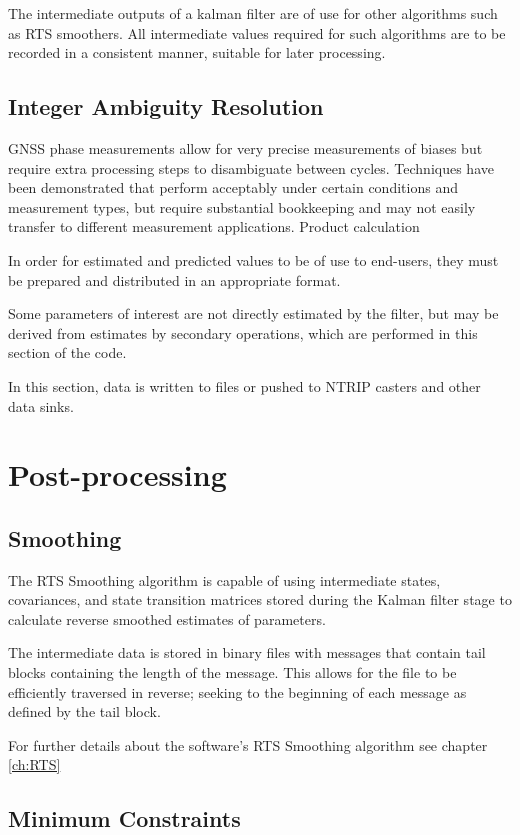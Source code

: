 The intermediate outputs of a kalman filter are of use for other algorithms such as RTS smoothers. All intermediate values required for such algorithms are to be recorded in a consistent manner, suitable for later processing.


\subsection{Integer Ambiguity Resolution}

GNSS phase measurements allow for very precise measurements of biases but require extra processing steps to disambiguate between cycles. Techniques have been demonstrated that perform acceptably under certain conditions and measurement types, but require substantial bookkeeping and may not easily transfer to different measurement applications.
Product calculation

In order for estimated and predicted values to be of use to end-users, they must be prepared and distributed in an appropriate format.

Some parameters of interest are not directly estimated by the filter, but may be derived from estimates by secondary operations, which are performed in this section of the code.

In this section, data is written to files or pushed to NTRIP casters and other data sinks.


\section{Post-processing}


\subsection{Smoothing}

The RTS Smoothing algorithm is capable of using intermediate states, covariances, and state transition matrices stored during the Kalman filter stage to calculate reverse smoothed estimates of parameters.

The intermediate data is stored in binary files with messages that contain tail blocks containing the length of the message. This allows for the file to be efficiently traversed in reverse; seeking to the beginning of each message as defined by the tail block.

For further details about the software's RTS Smoothing algorithm see chapter \ref{ch:RTS}


\subsection{Minimum Constraints}

